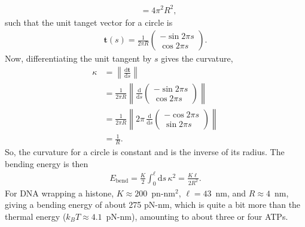 \documentclass{integrated_core_problems}
\begin{document}
\begin{answerkey}
\begin{solution}
\begin{itemize}
\begin{align}
        &= 4\pi^2 R^2,
      \end{align}
      such that the unit tanget vector for a circle is
      \begin{align}
        \mathbf{t}(s) = \frac{1}{2\pi R}\begin{pmatrix}
          -\sin 2\pi s \\ \cos 2\pi s
        \end{pmatrix}.
      \end{align}
      Now, differentiating the unit tangent by $s$ gives the curvature,
      \begin{align}
        \kappa &= \left\lVert\frac{\mathrm{d}\mathbf{t}}{\mathrm{d}s}\right\rVert \nonumber \\
         &= \frac{1}{2\pi R}\left\lVert \frac{\mathrm{d}}{\mathrm{d}s}\begin{pmatrix}
          -\sin 2\pi s \\ \cos 2\pi s
        \end{pmatrix}\right\rVert \nonumber \\
        &= \frac{1}{2\pi R}\left\lVert 2\pi \,\frac{\mathrm{d}}{\mathrm{d}s}\begin{pmatrix}
          -\cos 2\pi s \\ \sin 2\pi s
        \end{pmatrix}\right\rVert \nonumber \\
        &= \frac{1}{R}.
      \end{align}
      So, the curvature for a circle is constant and is the inverse of its radius. The bending energy is then
      \begin{align}
        E_\mathrm{bend} = \frac{K}{2}\int_0^\ell \mathrm{d}s\, \kappa^2 = \frac{K\ell}{2R^2}.
      \end{align}
      For DNA wrapping a histone, $K \approx 200$~pn-nm$^2$, $\ell = 43$~nm, and $R \approx 4$~nm, giving a bending energy of about 275 pN-nm, which is quite a bit more than the thermal energy ($k_BT \approx 4.1$~pN-nm), amounting to about three or four ATPs.
    \end{itemize}
  \end{solution}
\end{answerkey}
\end{document}
